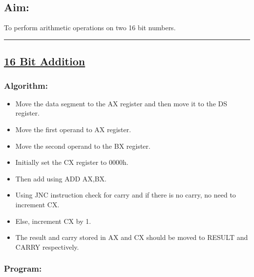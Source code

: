 \documentclass[12pt,a4paper]{article}
\begin{document}
\begin{flushleft}
\subsection*{\textbf{Aim:}} 
To perform arithmetic operations on two 16 bit numbers.

\vspace{1cm}
\hrule
\subsection*{\textbf{\underline{16 Bit Addition}}}

\subsubsection*{\textbf{Algorithm:}}
\begin{itemize}
    \item Move the data segment to the AX register and then move it to the DS register.
    \item Move the first operand to AX register. 
    \item Move the second operand to the BX register. 
    \item Initially set the CX register to 0000h. 
    \item Then add using ADD AX,BX.
    \item Using JNC instruction check for carry and if there is no carry, no need to increment CX.
    \item Else, increment CX by 1. 
    \item The result and carry stored in AX and CX should be moved to RESULT
and CARRY respectively.
\end{itemize}

\newpage
\subsubsection*{\textbf{Program:}}


\end{flushleft}
\end{document}
